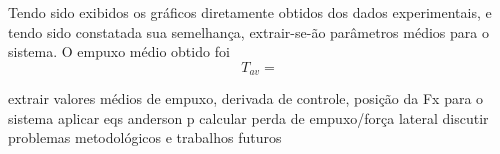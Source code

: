 Tendo sido exibidos os gráficos diretamente obtidos dos dados experimentais, e tendo sido constatada sua semelhança, extrair-se-ão parâmetros médios para o sistema. O empuxo médio obtido foi 
\begin{equation}
    T_{av} = 
\end{equation}

extrair valores médios de empuxo, derivada de controle, posição da Fx para o sistema
aplicar eqs anderson p calcular perda de empuxo/força lateral
discutir problemas metodológicos e trabalhos futuros